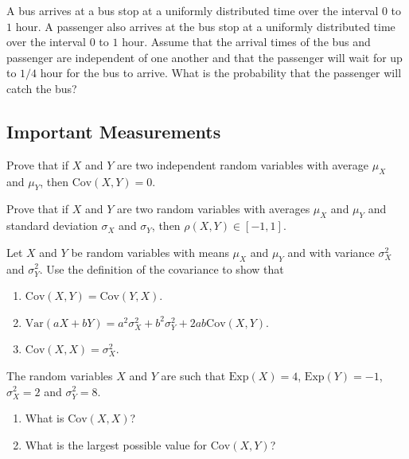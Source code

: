 \begin{problem}
A bus arrives at a bus stop at a uniformly distributed time over the interval $0$ to $1$ hour. A passenger also arrives at the bus stop at a uniformly distributed time over the interval $0$ to $1$ hour. Assume that the arrival times of the bus and passenger are independent of one another and that the passenger will wait for up to $1/4$ hour for the bus to arrive. What is the probability that the passenger will catch the bus?
\end{problem}

\subsection{Important Measurements}

\begin{problem}
Prove that if $X$ and $Y$ are two independent random variables with average $\mu_X$ and $\mu_Y$, then $\mathrm{Cov} (X, Y) = 0$. 
\end{problem}

\begin{problem}
Prove that if $X$ and $Y$ are two random variables with averages $\mu_X$ and $\mu_Y$ and standard deviation $\sigma_X$ and $\sigma_Y$, then $\rho (X, Y) \in [-1, 1]$.
\end{problem}

\begin{problem}
Let $X$ and $Y$ be random variables with means $\mu_X$ and $\mu_Y$ and with variance $\sigma_X^2$ and $\sigma_Y^2$. Use the definition of the covariance to show that
    \begin{enumerate}[label=\alph*)]
        \item $\mathrm{Cov} (X, Y) = \mathrm{Cov} (Y, X)$.
        \item $\mathrm{Var} (aX + bY) = a^2 \sigma_X^2 + b^2 \sigma_Y^2 + 2 ab \mathrm{Cov} (X, Y)$. 
        \item $\mathrm{Cov} (X, X) = \sigma_X^2$.
    \end{enumerate}
\end{problem}

\begin{problem}
The random variables $X$ and $Y$ are such that $\mathrm{Exp} (X) = 4$, $\mathrm{Exp} (Y) = -1$, $\sigma_X^2 = 2$ and $\sigma_Y^2 = 8$.
    \begin{enumerate}[label=\alph*)]
            \item What is $\mathrm{Cov} (X, X)$?
            \item What is the largest possible value for $\mathrm{Cov} (X, Y)$?
    \end{enumerate}
\end{problem}

